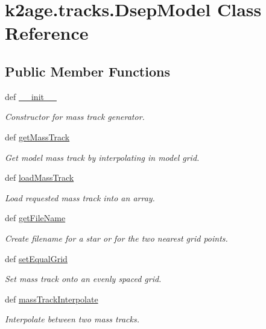 \hypertarget{classk2age_1_1tracks_1_1DsepModel}{\section{k2age.\-tracks.\-Dsep\-Model \-Class \-Reference}
\label{classk2age_1_1tracks_1_1DsepModel}
}
\subsection*{\-Public \-Member \-Functions}
\begin{DoxyCompactItemize}
\item 
def \hyperlink{classk2age_1_1tracks_1_1DsepModel_ac8adad44fbe3fc81363884bbf8a7e01d}{\-\_\-\-\_\-init\-\_\-\-\_\-}
\begin{DoxyCompactList}\small\item\em \-Constructor for mass track generator. \end{DoxyCompactList}\item 
def \hyperlink{classk2age_1_1tracks_1_1DsepModel_a28414f7b0b9a2bcb3d8ec7c5e149b694}{get\-Mass\-Track}
\begin{DoxyCompactList}\small\item\em \-Get model mass track by interpolating in model grid. \end{DoxyCompactList}\item 
def \hyperlink{classk2age_1_1tracks_1_1DsepModel_a6029b7513688463bbcaa3b596f9ed0c5}{load\-Mass\-Track}
\begin{DoxyCompactList}\small\item\em \-Load requested mass track into an array. \end{DoxyCompactList}\item 
def \hyperlink{classk2age_1_1tracks_1_1DsepModel_a06e3a34d025fd4052fd4659d248301dc}{get\-File\-Name}
\begin{DoxyCompactList}\small\item\em \-Create filename for a star or for the two nearest grid points. \end{DoxyCompactList}\item 
def \hyperlink{classk2age_1_1tracks_1_1DsepModel_aecb2aeaa7dc693fe01a6a851b59fea1d}{set\-Equal\-Grid}
\begin{DoxyCompactList}\small\item\em \-Set mass track onto an evenly spaced grid. \end{DoxyCompactList}\item 
def \hyperlink{classk2age_1_1tracks_1_1DsepModel_a04f4324a42a3d9fa2c32e67fdc84496c}{mass\-Track\-Interpolate}
\begin{DoxyCompactList}\small\item\em \-Interpolate between two mass tracks. \end{DoxyCompactList}\end{DoxyCompactItemize}
